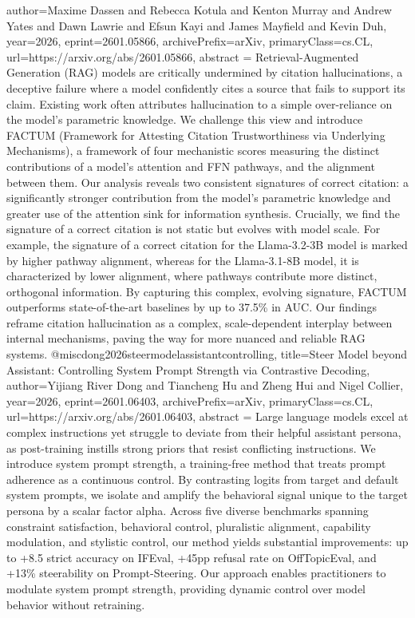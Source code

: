 {      author={Maxime Dassen and Rebecca Kotula and Kenton Murray and Andrew Yates and Dawn Lawrie and Efsun Kayi and James Mayfield and Kevin Duh},
      year={2026},
      eprint={2601.05866},
      archivePrefix={arXiv},
      primaryClass={cs.CL},
      url={https://arxiv.org/abs/2601.05866},
      abstract = {Retrieval-Augmented Generation (RAG) models are critically undermined by citation hallucinations, a deceptive failure where a model confidently cites a source that fails to support its claim. Existing work often attributes hallucination to a simple over-reliance on the model's parametric knowledge. We challenge this view and introduce FACTUM (Framework for Attesting Citation Trustworthiness via Underlying Mechanisms), a framework of four mechanistic scores measuring the distinct contributions of a model's attention and FFN pathways, and the alignment between them. Our analysis reveals two consistent signatures of correct citation: a significantly stronger contribution from the model's parametric knowledge and greater use of the attention sink for information synthesis. Crucially, we find the signature of a correct citation is not static but evolves with model scale. For example, the signature of a correct citation for the Llama-3.2-3B model is marked by higher pathway alignment, whereas for the Llama-3.1-8B model, it is characterized by lower alignment, where pathways contribute more distinct, orthogonal information. By capturing this complex, evolving signature, FACTUM outperforms state-of-the-art baselines by up to 37.5\% in AUC. Our findings reframe citation hallucination as a complex, scale-dependent interplay between internal mechanisms, paving the way for more nuanced and reliable RAG systems.}
}@misc{dong2026steermodelassistantcontrolling,
      title={Steer Model beyond Assistant: Controlling System Prompt Strength via Contrastive Decoding}, 
      author={Yijiang River Dong and Tiancheng Hu and Zheng Hui and Nigel Collier},
      year={2026},
      eprint={2601.06403},
      archivePrefix={arXiv},
      primaryClass={cs.CL},
      url={https://arxiv.org/abs/2601.06403},
      abstract = {Large language models excel at complex instructions yet struggle to deviate from their helpful assistant persona, as post-training instills strong priors that resist conflicting instructions. We introduce system prompt strength, a training-free method that treats prompt adherence as a continuous control. By contrasting logits from target and default system prompts, we isolate and amplify the behavioral signal unique to the target persona by a scalar factor alpha. Across five diverse benchmarks spanning constraint satisfaction, behavioral control, pluralistic alignment, capability modulation, and stylistic control, our method yields substantial improvements: up to +8.5 strict accuracy on IFEval, +45pp refusal rate on OffTopicEval, and +13\% steerability on Prompt-Steering. Our approach enables practitioners to modulate system prompt strength, providing dynamic control over model behavior without retraining.}
}
